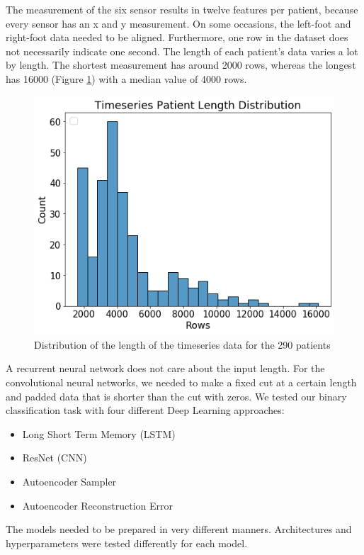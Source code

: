 \documentclass[journal]{IEEEtran}
\begin{document}
The measurement of the six sensor results in twelve features per patient, because every sensor has an x and y measurement. On some occasions, the left-foot and right-foot data needed to be aligned. Furthermore, one row in the dataset does not necessarily indicate one second. The length of each patient's data varies a lot by length. The shortest measurement has around 2000 rows, whereas the longest has 16000 (Figure \ref{fig:timeseries}) with a median value of 4000 rows.  

\begin{figure}
\centering
\includegraphics[width=1\linewidth]{../imgs/timeseries}
\caption{Distribution of the length of the timeseries data for the 290 patients}
\label{fig:timeseries}
\end{figure}

A recurrent neural network does not care about the input length. For the convolutional neural networks, we needed to make a fixed cut at a certain length and padded data that is shorter than the cut with zeros. We tested our binary classification task with four different Deep Learning approaches:

\begin{itemize}
\item Long Short Term Memory (LSTM)
\item ResNet (CNN)
\item Autoencoder Sampler
\item Autoencoder Reconstruction Error
\end{itemize}

The models needed to be prepared in very different manners. Architectures and hyperparameters were tested differently for each model. 
\end{document}
